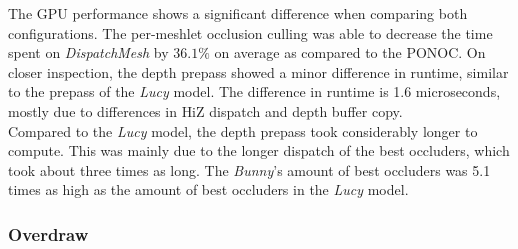 \noindent
The \ac{GPU} performance shows a significant difference when comparing both configurations. The per-meshlet 
occlusion culling was able to decrease the time spent on \emph{DispatchMesh} by $36.1\%$ on average as compared 
to the \ac{PONOC}. On closer inspection, the depth prepass showed a minor difference 
in runtime, similar to the prepass of the \emph{Lucy} model. The difference in runtime is 1.6 microseconds, 
mostly due to differences in \ac{HiZ} dispatch and depth buffer copy. \\

\noindent
Compared to the \emph{Lucy} model, the depth prepass took considerably longer to compute. This was mainly due to 
the longer dispatch of the best occluders, which took about three times as long. The \emph{Bunny}'s amount of 
best occluders was 5.1 times as high as the amount of best occluders in the \emph{Lucy} model.

\subsubsection*{Overdraw} \label{subsubsec-overdraw-bunny}

